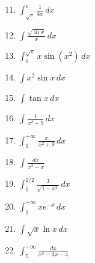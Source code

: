 \documentclass[12pt]{article}
\newif\ifans
\begin{document}
\begin{enumerate}
\setcounter{enumi}{10}

\item $\int^e_{\sqrt{e}} \frac{1}{4x} \,dx$ 

\ifans{\fbox{$\frac{1}{8}$}} \fi

\item $\int \frac{\sqrt{\ln{x}}}{x} \,dx$ 

\ifans{\fbox{$\frac{2}{3}\left(\ln{x}\right)^{3/2}+C$}} \fi

\item $\int^{\sqrt{\pi}}_{0} x\sin(x^2) \,dx$ 

\ifans{\fbox{$1$}} \fi

\item $\int x^2 \sin{x} \,dx$ 

\ifans{\fbox{$2x\sin{x}-x^2\cos{x}+2\cos{x}+C$}} \fi

\item $\int \tan{x} \,dx$ 

\ifans{\fbox{$-\ln{|\cos{x}|}+C=\ln|\sec{x}|+C$}} \fi

\item $\int \frac{1}{x^2+9} \,dx$

\ifans{\fbox{$\frac{1}{3}\arctan\left(\frac{x}{3}\right)+C$}} \fi

\item $\int^{+\infty}_1 \frac{x}{x^2+9} \,dx$

\ifans{\fbox{Diverges to $+\infty$}} \fi

\item $\int \frac{dx}{x^3-x}$

\ifans{\fbox{$\frac{1}{2}\ln|x-1|+\frac{1}{2}\ln|x+1|-\ln|x|+C$}} \fi

\item $\int^{1/2}_0 \frac{3}{\sqrt{1-x^2}} \,dx$

\ifans{\fbox{$\frac{\pi}{2}$}} \fi

\item $\int_1^{+\infty} xe^{-x} \,dx$

\ifans{\fbox{Converges to $\frac{2}{e}$}} \fi

\item $\int \sqrt{x}\ln{x} \,dx$

\ifans{\fbox{$\frac{2}{3}x^{3/2}\ln{x}-\frac{4}{9}x^{3/2}+C$}} \fi

\item $\int_5^{+\infty} \frac{dx}{x^2-3x-4}$

\ifans{\fbox{Converges to $\frac{1}{5}\ln{6}$}} \fi

\end{enumerate}
\end{document}
